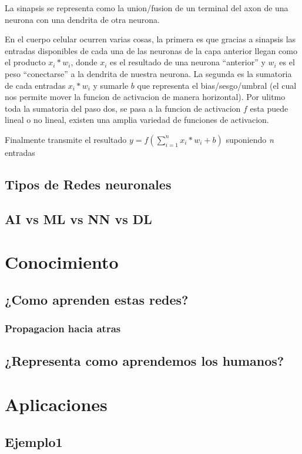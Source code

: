 \documentclass[runningheads]{llncs} %
\begin{document}
La sinapsis se representa como la union/fusion de un terminal del axon de una neurona
con una dendrita de otra neurona. 

En el cuerpo celular ocurren varias cosas, la primera es que gracias a sinapsis las
entradas disponibles de cada una de las neuronas de la capa anterior llegan como el 
producto \(x_{i}*w_{i}\), donde \(x_{i}\) es el resultado de una neurona 
\textquotedblleft{anterior}\textquotedblright{} y \(w_{i}\) es el peso 
\textquotedblleft{conectarse}\textquotedblright{} a la dendrita de nuestra neurona.
La segunda es la sumatoria de cada entradas \(x_{i}*w_{i}\) y sumarle
\(b\) que representa el bias/sesgo/umbral (el cual nos permite mover la funcion
de activacion de manera horizontal).
Por ulitmo toda la sumatoria del paso dos, se pasa a la funcion de activacion \(f\)
esta puede lineal o no lineal, existen una amplia variedad de funciones de activacion.

Finalmente transmite el resultado \(y = f(\sum_{i=1}^{n}{x_{i}*w_{i}} + b)\)
suponiendo \textit{n} entradas

\subsection{Tipos de Redes neuronales}
\subsection{AI vs ML vs NN vs DL}
\section{Conocimiento}
\subsection{¿Como aprenden estas redes?}
\subsubsection{Propagacion hacia atras}
\subsection{¿Representa como aprendemos los humanos?}
\section{Aplicaciones}
\subsection{Ejemplo1}
\end{document}
